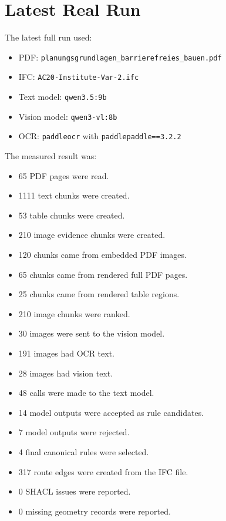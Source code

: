 \documentclass[11pt,a4paper]{article}
\begin{document}
\section{Latest Real Run}
The latest full run used:

\begin{itemize}
  \item PDF: \texttt{planungsgrundlagen\_barrierefreies\_bauen.pdf}
  \item IFC: \texttt{AC20-Institute-Var-2.ifc}
  \item Text model: \texttt{qwen3.5:9b}
  \item Vision model: \texttt{qwen3-vl:8b}
  \item OCR: \texttt{paddleocr} with \texttt{paddlepaddle==3.2.2}
\end{itemize}

The measured result was:

\begin{itemize}
  \item 65 PDF pages were read.
  \item 1111 text chunks were created.
  \item 53 table chunks were created.
  \item 210 image evidence chunks were created.
  \item 120 chunks came from embedded PDF images.
  \item 65 chunks came from rendered full PDF pages.
  \item 25 chunks came from rendered table regions.
  \item 210 image chunks were ranked.
  \item 30 images were sent to the vision model.
  \item 191 images had OCR text.
  \item 28 images had vision text.
  \item 48 calls were made to the text model.
  \item 14 model outputs were accepted as rule candidates.
  \item 7 model outputs were rejected.
  \item 4 final canonical rules were selected.
  \item 317 route edges were created from the IFC file.
  \item 0 SHACL issues were reported.
  \item 0 missing geometry records were reported.
\end{itemize}
\end{document}
